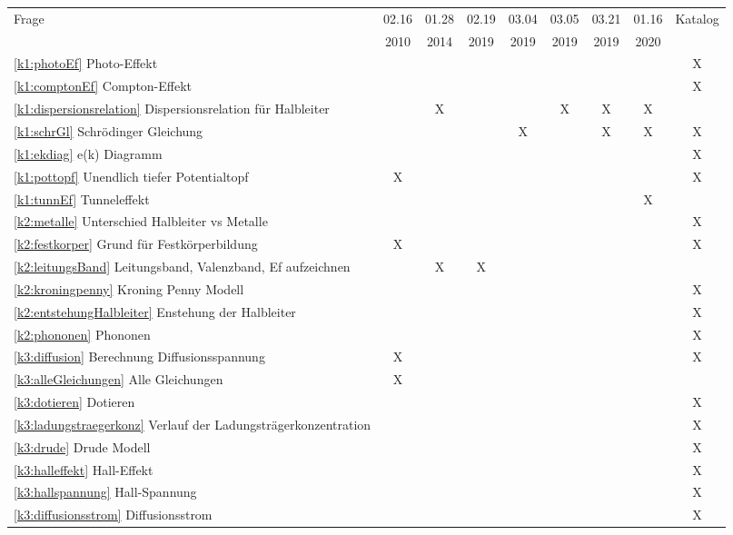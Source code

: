 \documentclass{article}
\begin{document}
\begin{center}
\begin{table}[H]
\begin{adjustbox}{width=\textwidth}
\centering
\begin{tabular}{lcccccccc}
Frage                & 02.16 & 01.28 & 02.19 & 03.04 & 03.05 & 03.21 & 01.16 & Katalog\\
                     & 2010  & 2014  & 2019  & 2019  & 2019  & 2019  & 2020 & \\
                     \hline
\ref{k1:photoEf} Photo-Effekt &&&&&&&& X \\
\ref{k1:comptonEf} Compton-Effekt &&&&&&&& X \\
\ref{k1:dispersionsrelation} Dispersionsrelation für Halbleiter && X &&& X & X & X & \\
\ref{k1:schrGl} Schrödinger Gleichung&&&& X &  & X & X & X \\
\ref{k1:ekdiag} e(k) Diagramm &&&&&&&& X \\
\ref{k1:pottopf} Unendlich tiefer Potentialtopf & X &&&&&&& X \\
\ref{k1:tunnEf} Tunneleffekt&&&&&&&X & \\
\ref{k2:metalle} Unterschied Halbleiter vs Metalle &&&&&&&& X\\
\ref{k2:festkorper} Grund für Festkörperbildung & X &&&&&&& X\\
\ref{k2:leitungsBand} Leitungsband, Valenzband, Ef aufzeichnen && X & X &&&&& \\
\ref{k2:kroningpenny} Kroning Penny Modell &&&&&&&& X \\
\ref{k2:entstehungHalbleiter} Enstehung der Halbleiter &&&&&&&& X \\
\ref{k2:phononen} Phononen &&&&&&&& X \\
\ref{k3:diffusion} Berechnung Diffusionsspannung & X &&&&&&& X \\
\ref{k3:alleGleichungen} Alle Gleichungen & X &&&&&&& \\
\ref{k3:dotieren} Dotieren &&&&&&&& X \\
\ref{k3:ladungstraegerkonz} Verlauf der Ladungstr\"agerkonzentration &&&&&&&& X \\
\ref{k3:drude} Drude Modell &&&&&&&& X \\
\ref{k3:halleffekt} Hall-Effekt &&&&&&&& X \\
\ref{k3:hallspannung} Hall-Spannung &&&&&&&& X \\
\ref{k3:diffusionsstrom} Diffusionsstrom &&&&&&&& X \\

\end{tabular}
\end{adjustbox}
\end{table}
\end{center}
\end{document}
